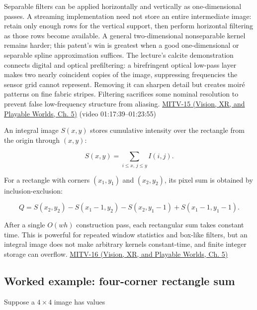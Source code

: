 Separable filters can be applied horizontally and vertically as one-dimensional passes. A streaming implementation need not store an entire intermediate image: retain only enough rows for the vertical support, then perform horizontal filtering as those rows become available. A general two-dimensional nonseparable kernel remains harder; this patent's win is greatest when a good one-dimensional or separable spline approximation suffices. The lecture's calcite demonstration connects digital and optical prefiltering: a birefringent optical low-pass layer makes two nearly coincident copies of the image, suppressing frequencies the sensor grid cannot represent. Removing it can sharpen detail but creates moiré patterns on fine fabric stripes. Filtering sacrifices some nominal resolution to prevent false low-frequency structure from aliasing. \href{../07-Vision-XR-and-Playable-Worlds/main.pdf\#nameddest=04-visual-computing-ii-ch036-mitv-15---alignment-patmax-distance-field-filtering-and-sub-sampling-us-7065262}{MITV-15 (Vision, XR, and Playable Worlds, Ch. 5)} (video 01:17:39--01:23:55)

An integral image \(S(x,y)\) stores cumulative intensity over the rectangle from the origin through \((x,y)\):

\[
S(x,y)=\sum_{i\le x,\,j\le y}I(i,j).
\]

For a rectangle with corners \((x_1,y_1)\) and \((x_2,y_2)\), its pixel sum is obtained by inclusion-exclusion:

\[
Q=S(x_2,y_2)-S(x_1-1,y_2)-S(x_2,y_1-1)+S(x_1-1,y_1-1).
\]

After a single \(O(wh)\) construction pass, each rectangular sum takes constant time. This is powerful for repeated window statistics and box-like filters, but an integral image does not make arbitrary kernels constant-time, and finite integer storage can overflow. \href{../07-Vision-XR-and-Playable-Worlds/main.pdf\#nameddest=04-visual-computing-ii-ch036-mitv-16---fast-convolution-low-pass-filter-approximations-integral-images-us-6457032}{MITV-16 (Vision, XR, and Playable Worlds, Ch. 5)}

\begin{allmightroleexample}

\subsection{Worked example: four-corner rectangle sum}\label{03-visual-computing-i-ch004-worked-example-four-corner-rectangle-sum}

\hypertarget{03-visual-computing-i-ch004-worked-example-four-corner-rectangle-sum}{}

Suppose a \(4\times4\) image has values

\end{allmightroleexample}


